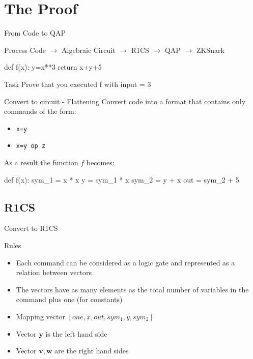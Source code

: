 \documentclass[handout]{beamer}
\begin{document}
\section{The Proof}

\begin{frame}[fragile]{From Code to QAP}

\begin{block}{Process}
Code $\rightarrow$ Algebraic Circuit $\rightarrow$ R1CS 
$\rightarrow$ QAP $\rightarrow$ ZKSnark
\end{block}
\pause
\begin{python}
    def f(x): 
        y=x**3 
        return x+y+5   
\end{python}
\pause
\begin{block}{Task}
Prove that you executed f with input = $3$
\end{block}
\end{frame}

\begin{frame}[fragile]{Convert to circuit - Flattening}
    Convert code into a format that contains only commands of the form:
    \begin{itemize}
        \item \texttt{x=y}
        \item \texttt{x=y op z}  
    \end{itemize}
    \pause
    As a result the function $f$ becomes:    
   \begin{python}
        def f(x): 
            sym_1 = x * x 
            y = sym_1 * x    
            sym_2 = y + x   
            out = sym_2 + 5
    \end{python}    
\end{frame}

\subsection{R1CS}
\begin{frame}{Convert to R1CS} 
\begin{block}{Rules}
    \begin{itemize}
        \item Each command can be considered as a logic gate and represented as a relation between vectors \pause
        \item The vectors have as many elements as the total number of variables in the command plus one (for constants) \pause
        \item Mapping vector $ [ one,  x,  out,  sym_1,  y,  sym_2 ] $ \pause
        \item Vector $\bm{y}$ is the left hand side \pause
        \item Vector $\bm{v}, \bm{w}$ are the right hand sides \pause
    \end{itemize}  
\end{block}

\end{frame}
 
\end{document}
